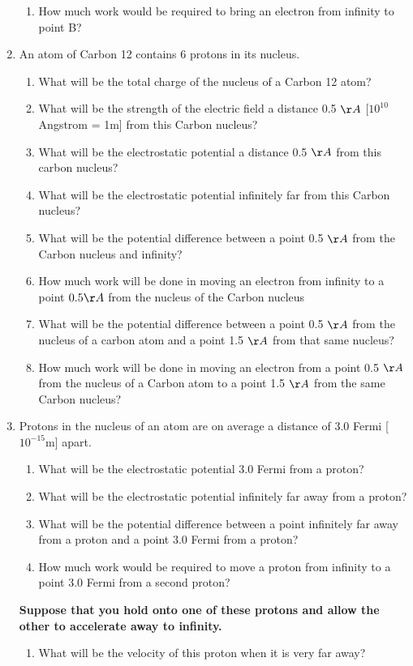 \documentclass[12pt]{article}
\begin{document}
\begin{enumerate}
\begin{enumerate}
  \item How much work would be required to bring an electron from infinity to point B?
\end{enumerate}

\item An atom of Carbon 12 contains 6 protons in its nucleus.
\begin{enumerate}
  \item What will be the total charge of the nucleus of a Carbon 12 atom?
  \item What will be the strength of the electric field a distance 0.5 $\AA$ [$10^{10}$ Angstrom = 1m] from this
    Carbon nucleus?
  \item What will be the electrostatic potential a distance 0.5 $\AA$ from this carbon nucleus?
  \item What will be the electrostatic potential infinitely far from this Carbon nucleus?
  \item What will be the potential difference between a point 0.5 $\AA$ from the Carbon nucleus and infinity?
  \item How much work will be done in moving an electron from infinity to a point $0.5 \AA$ from the nucleus of the Carbon nucleus
  \item What will be the potential difference between a point 0.5 $\AA$ from the nucleus of a carbon atom and a point 1.5 $\AA$ from that same nucleus?
  \item How much work will be done in moving an electron from a point 0.5 $\AA$ from the nucleus of a Carbon atom to a point 1.5 $\AA$ from the same Carbon nucleus?
\end{enumerate}

\item Protons in the nucleus of an atom are on average a distance of 3.0 Fermi [$10^{-15}$m] apart.
\begin{enumerate}
  \item What will be the electrostatic potential 3.0 Fermi from a proton?
  \item What will be the electrostatic potential infinitely far away from a proton?
  \item What will be the potential difference between a point infinitely far away from a proton and a point 3.0 Fermi from a proton?
  \item How much work would be required to move a proton from infinity to a point 3.0 Fermi from a second proton?
\end{enumerate}

\textbf{Suppose that you hold onto one of these protons and allow the other to accelerate away to infinity.}

\begin{enumerate}[resume]
  \item What will be the velocity of this proton when it is very far away?
\end{enumerate}

\end{enumerate}
\end{document}
